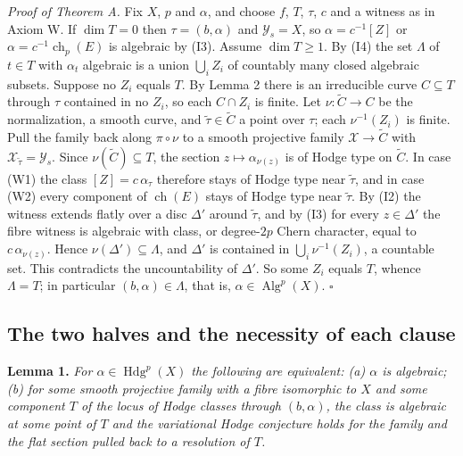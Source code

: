 \documentclass[10pt,twocolumn]{article}
\begin{document}
\emph{Proof of Theorem A.} Fix \(X\), \(p\) and \(\alpha\), and choose
\(f\), \(T\), \(\tau\), \(c\) and a witness as in Axiom W. If
\(\dim T=0\) then \(\tau=(b,\alpha)\) and \(\mathcal{Y}_s=X\), so
\(\alpha=c^{-1}[Z]\) or \(\alpha=c^{-1}\operatorname{ch}_p(E)\) is
algebraic by (I3). Assume \(\dim T\ge 1\). By (I4) the set \(\Lambda\)
of \(t\in T\) with \(\alpha_t\) algebraic is a union \(\bigcup_i Z_i\)
of countably many closed algebraic subsets. Suppose no \(Z_i\) equals
\(T\). By Lemma 2 there is an irreducible curve \(C\subseteq T\) through
\(\tau\) contained in no \(Z_i\), so each \(C\cap Z_i\) is finite. Let
\(\nu\colon\tilde C\to C\) be the normalization, a smooth curve, and
\(\tilde\tau\in\tilde C\) a point over \(\tau\); each \(\nu^{-1}(Z_i)\)
is finite. Pull the family back along \(\pi\circ\nu\) to a smooth
projective family \(\mathcal{X}\to\tilde C\) with
\(\mathcal{X}_{\tilde\tau}=\mathcal{Y}_s\). Since
\(\nu(\tilde C)\subseteq T\), the section \(z\mapsto\alpha_{\nu(z)}\) is
of Hodge type on \(\tilde C\). In case (W1) the class
\([Z]=c\,\alpha_\tau\) therefore stays of Hodge type near
\(\tilde\tau\), and in case (W2) every component of
\(\operatorname{ch}(E)\) stays of Hodge type near \(\tilde\tau\). By
(I2) the witness extends flatly over a disc \(\Delta'\) around
\(\tilde\tau\), and by (I3) for every \(z\in\Delta'\) the fibre witness
is algebraic with class, or degree-\(2p\) Chern character, equal to
\(c\,\alpha_{\nu(z)}\). Hence \(\nu(\Delta')\subseteq\Lambda\), and
\(\Delta'\) is contained in \(\bigcup_i\nu^{-1}(Z_i)\), a countable set.
This contradicts the uncountability of \(\Delta'\). So some \(Z_i\)
equals \(T\), whence \(\Lambda=T\); in particular
\((b,\alpha)\in\Lambda\), that is, \(\alpha\in\operatorname{Alg}^p(X)\).
\(\square\)

\hypertarget{the-two-halves-and-the-necessity-of-each-clause}{%
\subsection{The two halves and the necessity of each
clause}\label{the-two-halves-and-the-necessity-of-each-clause}}

\textbf{Lemma 1.} \emph{For \(\alpha\in\operatorname{Hdg}^p(X)\) the
following are equivalent: (a) \(\alpha\) is algebraic; (b) for some
smooth projective family with a fibre isomorphic to \(X\) and some
component \(T\) of the locus of Hodge classes through \((b,\alpha)\),
the class is algebraic at some point of \(T\) and the variational Hodge
conjecture holds for the family and the flat section pulled back to a
resolution of \(T\).}
\end{document}
